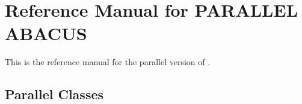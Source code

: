 
\chapter{Reference Manual for PARALLEL ABACUS}
\label{chapter:ParReferenceManual}

This is the reference manual for the parallel version of \ABACUS.

\section{Parallel Classes}











































